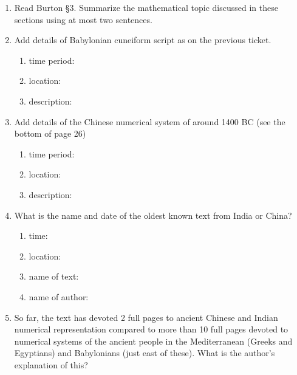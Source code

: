 \documentclass[12pt]{article}
\begin{document}
\begin{enumerate}
\item Read Burton \S 3. Summarize the mathematical topic discussed in these sections using at most two sentences.
\vspace{1in}
\item Add details of Babylonian cuneiform script as on the previous ticket.
	\begin{enumerate}
	\item time period:
	\item location:
	\item description: 
	\end{enumerate}
\vfill
	
\item Add details of the Chinese numerical system of around 1400 BC (see the bottom of page 26)
	\begin{enumerate}
	\item time period:
	\item location:
	\item description: 
	\end{enumerate}
\vfill
	
\item What is the name and date of the oldest known text from India or China?
	\begin{enumerate}
	\item time:
	\item location:
	\item name of text: 
	\item name of author:
	\end{enumerate}
		
\item So far, the text has devoted 2 full pages to ancient Chinese and Indian numerical representation compared to more than 10 full pages devoted to numerical systems of the ancient people in the Mediterranean (Greeks and Egyptians) and Babylonians (just east of these). What is the author's explanation of this?
\vfill

\end{enumerate}
\end{document}
